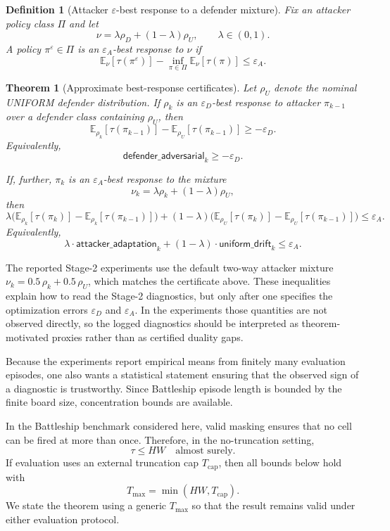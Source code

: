\documentclass[11pt]{article}
\newtheorem{definition}{Definition}
\newtheorem{theorem}{Theorem}
\newcommand{\E}{\mathbb{E}}
\newcommand{\tauT}{\tau}
\begin{document}
\begin{definition}[Attacker $\varepsilon$-best response to a defender mixture]
Fix an attacker policy class $\Pi$ and let
\[
\nu=\lambda \rho_D+(1-\lambda)\rho_U, \qquad \lambda\in(0,1).
\]
A policy $\pi^\varepsilon\in\Pi$ is an $\varepsilon_A$-best response to $\nu$ if
\[
\E_{\nu}[\tauT(\pi^\varepsilon)]-\inf_{\pi\in\Pi}\E_{\nu}[\tauT(\pi)]\le \varepsilon_A.
\]
\end{definition}

\begin{theorem}[Approximate best-response certificates]
Let $\rho_U$ denote the nominal UNIFORM defender distribution.
If $\rho_k$ is an $\varepsilon_D$-best response to attacker $\pi_{k-1}$ over a defender class containing $\rho_U$, then
\[
\E_{\rho_k}[\tauT(\pi_{k-1})]-\E_{\rho_U}[\tauT(\pi_{k-1})]\ge -\varepsilon_D.
\]
Equivalently,
\[
\textsf{defender\_adversarial}_k \ge -\varepsilon_D.
\]

If, further, $\pi_k$ is an $\varepsilon_A$-best response to the mixture
\[
\nu_k=\lambda \rho_k+(1-\lambda)\rho_U,
\]
then
\[
\lambda\Big(\E_{\rho_k}[\tauT(\pi_k)]-\E_{\rho_k}[\tauT(\pi_{k-1})]\Big)
+
(1-\lambda)\Big(\E_{\rho_U}[\tauT(\pi_k)]-\E_{\rho_U}[\tauT(\pi_{k-1})]\Big)
\le \varepsilon_A.
\]
Equivalently,
\[
\lambda \cdot \textsf{attacker\_adaptation}_k + (1-\lambda)\cdot \textsf{uniform\_drift}_k \le \varepsilon_A.
\]
\end{theorem}

The reported Stage-2 experiments use the default two-way attacker mixture $\nu_k=0.5\,\rho_k+0.5\,\rho_U$, which matches the certificate above. These inequalities explain how to read the Stage-2 diagnostics, but only after one specifies the optimization errors $\varepsilon_D$ and $\varepsilon_A$. In the experiments those quantities are not observed directly, so the logged diagnostics should be interpreted as theorem-motivated proxies rather than as certified duality gaps.

Because the experiments report empirical means from finitely many evaluation episodes, one also wants a statistical statement ensuring that the observed sign of a diagnostic is trustworthy. Since Battleship episode length is bounded by the finite board size, concentration bounds are available.

In the Battleship benchmark considered here, valid masking ensures that no cell can be fired at more than once. Therefore, in the no-truncation setting,
\[
\tauT \le HW
\quad\text{almost surely}.
\]
If evaluation uses an external truncation cap $T_{\mathrm{cap}}$, then all bounds below hold with
\[
T_{\max}=\min(HW,T_{\mathrm{cap}}).
\]
We state the theorem using a generic $T_{\max}$ so that the result remains valid under either evaluation protocol.
\end{document}
